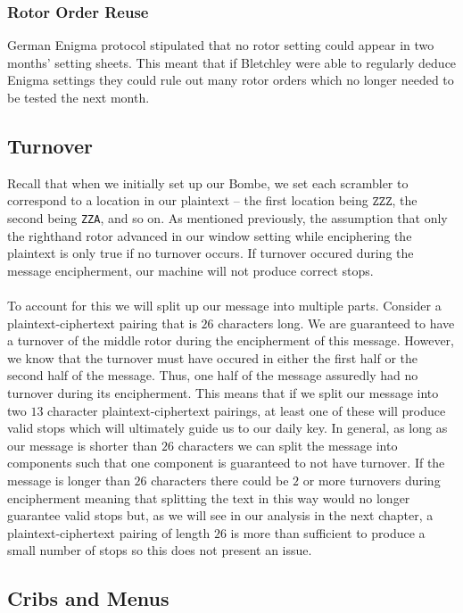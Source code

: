 \subsubsection{Rotor Order Reuse}
German Enigma protocol stipulated that no rotor setting could appear in two months' setting sheets. This meant that if Bletchley were able to regularly deduce Enigma settings they could rule out many rotor orders which no longer needed to be tested the next month.

\subsection{Turnover}
Recall that when we initially set up our Bombe, we set each scrambler
to correspond to a location in our plaintext -- the first location
being $\texttt{ZZZ}$, the second being \texttt{ZZA}, and so on. As
mentioned previously, the assumption that only the righthand rotor
advanced in our window setting while enciphering the plaintext is
only true if no turnover occurs. If turnover occured during the
message encipherment, our machine will not produce correct stops.
\\\\To account for this we will split up our message into multiple
parts. Consider a plaintext-ciphertext pairing that is $26$
characters long. We are guaranteed to have a turnover of the middle
rotor during the encipherment of this message. However, we know that
the turnover must have occured in either the first half or the second
half of the message. Thus, one half of the message assuredly had no
turnover during its encipherment. This means that if we split our
message into two $13$ character plaintext-ciphertext pairings, at
least one of these will produce valid stops which will ultimately
guide us to our daily key. In general, as long as our message is
shorter than $26$ characters we can split the message into components
such that one component is guaranteed to not have turnover. If the
message is longer than $26$ characters there could be $2$ or more
turnovers during encipherment meaning that splitting the text in this
way would no longer guarantee valid stops but, as we will see in our
analysis in the next chapter, a plaintext-ciphertext pairing of
length $26$ is more than sufficient to produce a small number of
stops so this does not present an issue.
\subsection{Cribs and Menus}

